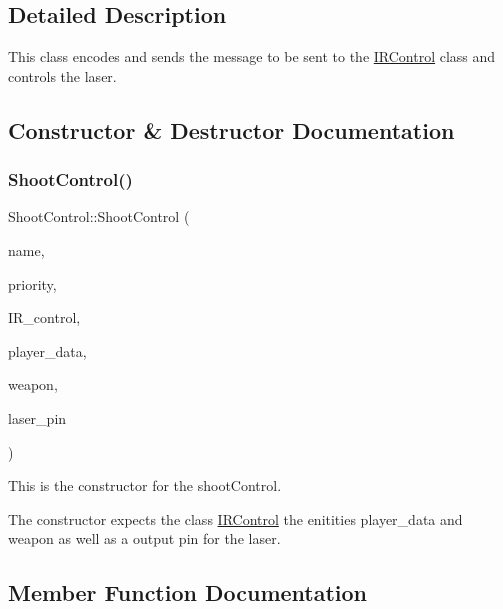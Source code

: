 \subsection{Detailed Description}
This class encodes and sends the message to be sent to the \mbox{\hyperlink{class_i_r_control}{I\+R\+Control}} class and controls the laser. 

\subsection{Constructor \& Destructor Documentation}
\mbox{\label{class_shoot_control_af9c21b16c798f217b2da762d569473cd}} 
\subsubsection{\texorpdfstring{Shoot\+Control()}{ShootControl()}}
{\footnotesize\ttfamily Shoot\+Control\+::\+Shoot\+Control (\begin{DoxyParamCaption}\item[{const char $\ast$}]{name,  }\item[{int}]{priority,  }\item[{\mbox{\hyperlink{class_i_r_control}{I\+R\+Control}} \&}]{I\+R\+\_\+control,  }\item[{\mbox{\hyperlink{class_player_data}{Player\+Data}} \&}]{player\+\_\+data,  }\item[{\mbox{\hyperlink{class_weapon}{Weapon}} \&}]{weapon,  }\item[{hwlib\+::pin\+\_\+out \&}]{laser\+\_\+pin }\end{DoxyParamCaption})\hspace{0.3cm}{\ttfamily [inline]}}



This is the constructor for the shoot\+Control. 

The constructor expects the class \mbox{\hyperlink{class_i_r_control}{I\+R\+Control}} the enitities player\+\_\+data and weapon as well as a output pin for the laser. 

\subsection{Member Function Documentation}
\mbox{\label{class_shoot_control_afda9df061db3b34fdf9affed32f2c325}} 
